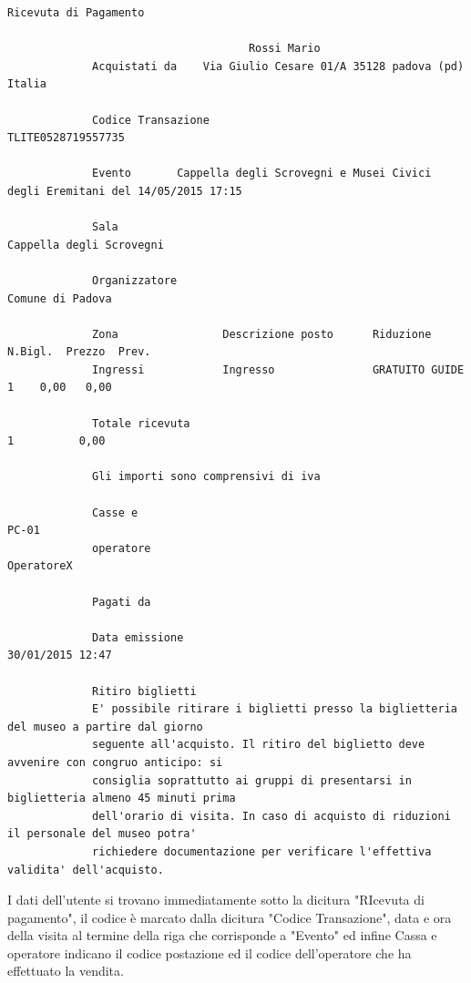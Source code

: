 \begin{center}
\begin{lstlisting}
Ricevuta di Pagamento

                                     Rossi Mario
             Acquistati da    Via Giulio Cesare 01/A 35128 padova (pd) Italia
             
             Codice Transazione                                                      TLITE0528719557735
             
             Evento       Cappella degli Scrovegni e Musei Civici degli Eremitani del 14/05/2015 17:15 
             
             Sala                                                              Cappella degli Scrovegni
             
             Organizzatore                                                             Comune di Padova
             
             Zona                Descrizione posto      Riduzione             N.Bigl.  Prezzo  Prev.
             Ingressi            Ingresso               GRATUITO GUIDE              1    0,00   0,00
             
             Totale ricevuta                                                      1          0,00
             
             Gli importi sono comprensivi di iva
             
             Casse e                                                                         PC-01
             operatore                                                                        OperatoreX 
             
             Pagati da
             
             Data emissione                                                            30/01/2015 12:47
             
             Ritiro biglietti
             E' possibile ritirare i biglietti presso la biglietteria del museo a partire dal giorno 
             seguente all'acquisto. Il ritiro del biglietto deve avvenire con congruo anticipo: si 
             consiglia soprattutto ai gruppi di presentarsi in biglietteria almeno 45 minuti prima 
             dell'orario di visita. In caso di acquisto di riduzioni il personale del museo potra' 
             richiedere documentazione per verificare l'effettiva validita' dell'acquisto. 

\end{lstlisting}
\end{center}
I dati dell'utente si trovano immediatamente sotto la dicitura "RIcevuta di pagamento", il codice \tlite è marcato dalla dicitura "Codice Transazione", data e ora della visita al termine della riga che corrisponde a "Evento" ed infine Cassa e operatore indicano il codice postazione ed il codice dell'operatore  che ha effettuato la vendita.

